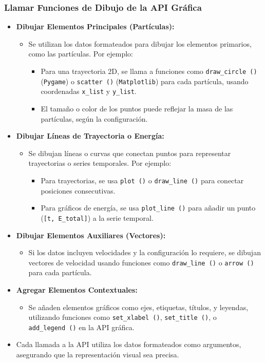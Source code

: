 \subsubsection*{Llamar Funciones de Dibujo de la API Gráfica}
\begin{itemize}
    \item \textbf{Dibujar Elementos Principales (Partículas):}
    \begin{itemize}
        \item Se utilizan los datos formateados para dibujar los elementos primarios, como las partículas. Por ejemplo:
        \begin{itemize}
            \item Para una trayectoria 2D, se llama a funciones como \texttt{draw\_circle~()} (\texttt{Pygame}) o \texttt{scatter~()} (\texttt{Matplotlib}) para cada partícula, usando coordenadas \texttt{x\_list} y \texttt{y\_list}.
            \item El tamaño o color de los puntos puede reflejar la masa de las partículas, según la configuración.
        \end{itemize}
    \end{itemize}
    \item \textbf{Dibujar Líneas de Trayectoria o Energía:}
    \begin{itemize}
        \item Se dibujan líneas o curvas que conectan puntos para representar trayectorias o series temporales. Por ejemplo:
        \begin{itemize}
            \item Para trayectorias, se usa \texttt{plot~()} o \texttt{draw\_line~()} para conectar posiciones consecutivas.
            \item Para gráficos de energía, se usa \texttt{plot\_line~()} para añadir un punto (\texttt{[t, E\_total]}) a la serie temporal.
        \end{itemize}
    \end{itemize}
    \item \textbf{Dibujar Elementos Auxiliares (Vectores):}
    \begin{itemize}
        \item Si los datos incluyen velocidades y la configuración lo requiere, se dibujan vectores de velocidad usando funciones como \texttt{draw\_line~()} o \texttt{arrow~()} para cada partícula.
    \end{itemize}
    \item \textbf{Agregar Elementos Contextuales:}
    \begin{itemize}
        \item Se añaden elementos gráficos como ejes, etiquetas, títulos, y leyendas, utilizando funciones como \texttt{set\_xlabel~()}, \texttt{set\_title~()}, o \texttt{add\_legend~()} en la API gráfica.
    \end{itemize}
    \item Cada llamada a la API utiliza los datos formateados como argumentos, asegurando que la representación visual sea precisa.
\end{itemize}


